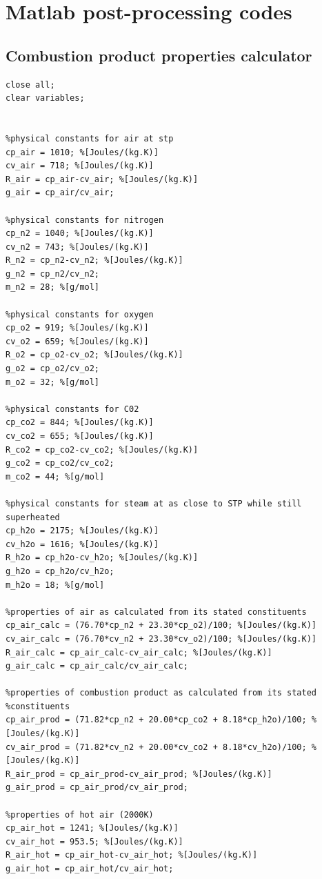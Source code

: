 \documentclass[a4paper, 11pt, oneside]{report}
\begin{document}
\appendix



\chapter{Matlab post-processing codes}


\section{Combustion product properties calculator} \label{code_combustion_products_calculator}
\begin{verbatim}
close all;
clear variables;


%physical constants for air at stp
cp_air = 1010; %[Joules/(kg.K)]
cv_air = 718; %[Joules/(kg.K)]
R_air = cp_air-cv_air; %[Joules/(kg.K)]
g_air = cp_air/cv_air; 

%physical constants for nitrogen
cp_n2 = 1040; %[Joules/(kg.K)]
cv_n2 = 743; %[Joules/(kg.K)]
R_n2 = cp_n2-cv_n2; %[Joules/(kg.K)]
g_n2 = cp_n2/cv_n2;
m_n2 = 28; %[g/mol]

%physical constants for oxygen
cp_o2 = 919; %[Joules/(kg.K)]
cv_o2 = 659; %[Joules/(kg.K)]
R_o2 = cp_o2-cv_o2; %[Joules/(kg.K)]
g_o2 = cp_o2/cv_o2;
m_o2 = 32; %[g/mol]

%physical constants for C02
cp_co2 = 844; %[Joules/(kg.K)]
cv_co2 = 655; %[Joules/(kg.K)]
R_co2 = cp_co2-cv_co2; %[Joules/(kg.K)]
g_co2 = cp_co2/cv_co2;
m_co2 = 44; %[g/mol]

%physical constants for steam at as close to STP while still superheated
cp_h2o = 2175; %[Joules/(kg.K)]
cv_h2o = 1616; %[Joules/(kg.K)]
R_h2o = cp_h2o-cv_h2o; %[Joules/(kg.K)]
g_h2o = cp_h2o/cv_h2o;
m_h2o = 18; %[g/mol]

%properties of air as calculated from its stated constituents
cp_air_calc = (76.70*cp_n2 + 23.30*cp_o2)/100; %[Joules/(kg.K)]
cv_air_calc = (76.70*cv_n2 + 23.30*cv_o2)/100; %[Joules/(kg.K)]
R_air_calc = cp_air_calc-cv_air_calc; %[Joules/(kg.K)]
g_air_calc = cp_air_calc/cv_air_calc;

%properties of combustion product as calculated from its stated
%constituents
cp_air_prod = (71.82*cp_n2 + 20.00*cp_co2 + 8.18*cp_h2o)/100; %[Joules/(kg.K)]
cv_air_prod = (71.82*cv_n2 + 20.00*cv_co2 + 8.18*cv_h2o)/100; %[Joules/(kg.K)]
R_air_prod = cp_air_prod-cv_air_prod; %[Joules/(kg.K)]
g_air_prod = cp_air_prod/cv_air_prod;

%properties of hot air (2000K)
cp_air_hot = 1241; %[Joules/(kg.K)]
cv_air_hot = 953.5; %[Joules/(kg.K)]
R_air_hot = cp_air_hot-cv_air_hot; %[Joules/(kg.K)]
g_air_hot = cp_air_hot/cv_air_hot;


\end{verbatim}
\end{document}
